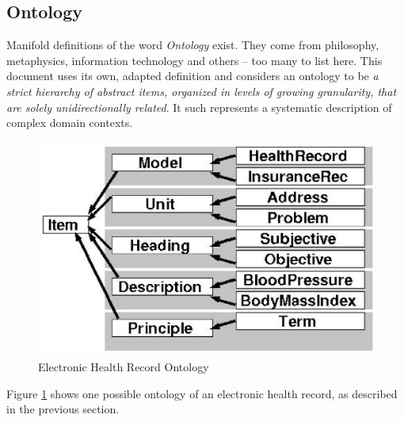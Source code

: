 %
%
%
%
%
%
%

\subsection{Ontology}
\label{ontology_heading}

Manifold definitions of the word \emph{Ontology} exist. They come from philosophy,
metaphysics, information technology and others -- too many to list here.
This document uses its own, adapted definition and considers an ontology to be
\emph{a strict hierarchy of abstract items, organized in levels of growing
granularity, that are solely unidirectionally related}. It such represents a
systematic description of complex domain contexts.

\begin{figure}[ht]
    \begin{center}
        \includegraphics[scale=0.4]{vector/electronic_health_record_ontology.eps}
        \caption{Electronic Health Record Ontology}
        \label{electronic_health_record_ontology_figure}
    \end{center}
\end{figure}

Figure \ref{electronic_health_record_ontology_figure} shows one possible ontology
of an electronic health record, as described in the previous section.

